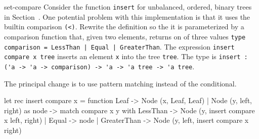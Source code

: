 %
\begin{exercise}{set-compare}
Consider the function \hbox{\lstinline/insert/} for unbalanced, ordered, binary trees in
Section~.  One potential problem with this implementation is that it
uses the builtin comparison \hbox{\lstinline/(<)/}.  Rewrite the definition so the it is parameterized by a
comparison function that, given two elements, returns on of three values
%
\hbox{\lstinline/type comparison = LessThan | Equal | GreaterThan/}.
%
The expression \hbox{\lstinline/insert compare x tree/} inserts an element \hbox{\lstinline/x/} into the tree
\hbox{\lstinline/tree/}.  The type is
%
\hbox{\lstinline/insert : ('a -> 'a -> comparison) -> 'a -> 'a tree -> 'a tree/}.

\begin{answer}\ifanswers
The principal change is to use pattern matching instead of the conditional.

\begin{ocaml}
let rec insert compare x = function
   Leaf -> Node (x, Leaf, Leaf)
 | Node (y, left, right) as node ->
     match compare x y with
        LessThan -> Node (y, insert compare x left, right)
      | Equal -> node
      | GreaterThan -> Node (y, left, insert compare x right)
\end{ocaml}
\fi\end{answer}
\end{exercise}

